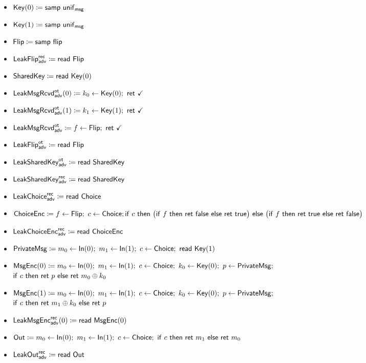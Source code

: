\begin{itemize}
\item $\mathsf{Key}(0) \coloneqq \mathsf{samp} \ \mathsf{unif}_{\mathsf{msg}}$
\item {\color{red} $\mathsf{Key}(1) \coloneqq \mathsf{samp} \ \mathsf{unif}_{\mathsf{msg}}$}
\item $\mathsf{Flip} \coloneqq \mathsf{samp} \ \mathsf{flip}$
\item {\color{blue} $\mathsf{LeakFlip}^{\mathsf{rec}}_{\mathsf{adv}} \coloneqq \mathsf{read} \ \mathsf{Flip}$}
\item $\mathsf{SharedKey} \coloneqq \mathsf{read} \ \mathsf{Key}(0)$
\item {\color{blue} $\LeakKeyRcvd^\ot_\adv(0) \coloneqq k_0 \leftarrow \Key(0); \ \ret{\checkmark}$}
\item {\color{blue} $\LeakKeyRcvd^\ot_\adv(1) \coloneqq k_1 \leftarrow \Key(1); \ \ret{\checkmark}$}
\item {\color{blue} $\mathsf{LeakMsgRcvd}^{\mathsf{ot}}_{\mathsf{adv}} \coloneqq f \leftarrow \mathsf{Flip}; \ \mathsf{ret} \ \checkmark$}
\item {\color{blue} $\mathsf{LeakFlip}^{\mathsf{ot}}_{\mathsf{adv}} \coloneqq \mathsf{read} \ \mathsf{Flip}$}
\item {\color{blue} $\mathsf{LeakSharedKey}^{\mathsf{ot}}_{\mathsf{adv}} \coloneqq \mathsf{read} \ \mathsf{SharedKey}$}
\item {\color{blue} $\mathsf{LeakSharedKey}^{\mathsf{rec}}_{\mathsf{adv}} \coloneqq \mathsf{read} \ \mathsf{SharedKey}$}
\item {\color{blue} $\mathsf{LeakChoice}^{\mathsf{rec}}_{\mathsf{adv}} \coloneqq \mathsf{read} \ \mathsf{Choice}$}
\item $\mathsf{ChoiceEnc} \coloneqq f \leftarrow \mathsf{Flip}; \ c \leftarrow \mathsf{Choice}; \\ \mathsf{if} \ c \ \mathsf{then} \ \big(\mathsf{if} \ f \ \mathsf{then} \ \mathsf{ret} \ \mathsf{false} \ \mathsf{else} \ \mathsf{ret} \ \mathsf{true}\big) \ \mathsf{else} \ \big(\mathsf{if} \ f \ \mathsf{then} \ \mathsf{ret} \ \mathsf{true} \ \mathsf{else} \ \mathsf{ret} \ \mathsf{false}\big)$
\item {\color{blue} $\mathsf{LeakChoiceEnc}^{\mathsf{rec}}_{\mathsf{adv}} \coloneqq \mathsf{read} \ \mathsf{ChoiceEnc}$}
\item {\color{red} $\PrivateMsg \coloneqq m_0 \leftarrow \In(0); \ m_1 \leftarrow \In(1); \ c \leftarrow \Choice; \ \read{\Key(1)}$}
\item $\mathsf{MsgEnc}(0) \coloneqq m_0 \leftarrow \mathsf{In}(0); \ m_1 \leftarrow \mathsf{In}(1); \ c \leftarrow \mathsf{Choice}; \ k_0 \leftarrow \mathsf{Key}(0); \ p \leftarrow \mathsf{PrivateMsg};$ \\ $\mathsf{if} \ c \ \mathsf{then} \ \mathsf{ret} \ p \ \mathsf{else} \ \mathsf{ret} \ m_0 \oplus k_0$
\item $\mathsf{MsgEnc}(1) \coloneqq m_0 \leftarrow \mathsf{In}(0); \ m_1 \leftarrow \mathsf{In}(1); \ c \leftarrow \mathsf{Choice}; \ k_0 \leftarrow \mathsf{Key}(0); \ p \leftarrow \mathsf{PrivateMsg};$ \\ $\mathsf{if} \ c \ \mathsf{then} \ \mathsf{ret} \ m_1 \oplus k_0 \ \mathsf{else} \ \mathsf{ret} \ p$
\item {\color{blue} $\mathsf{LeakMsgEnc}^{\mathsf{rec}}_{\mathsf{adv}}(0) \coloneqq \mathsf{read} \ \mathsf{MsgEnc}(0)$}
\item $\Out \coloneqq m_0 \leftarrow \In(0); \ m_1 \leftarrow \In(1); \ c \leftarrow \Choice; \ \ifte{c}{\ret{m_1}}{\ret{m_0}}$
\item {\color{blue} $\mathsf{LeakOut}^{\mathsf{rec}}_{\mathsf{adv}} \coloneqq \mathsf{read} \ \mathsf{Out}$}
\end{itemize}

